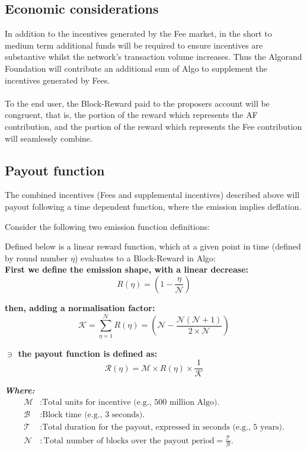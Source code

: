 \documentclass[11pt,a4paper]{article}
\begin{document}
\subsection{Economic considerations} \label{subsec:eco}
In addition to the incentives generated by the Fee market, in the short to medium term additional funds will be required
to ensure incentives are substantive whilst the network's transaction volume increases. Thus the Algorand Foundation 
will contribute an additional sum of Algo to supplement the incentives generated by Fees. \\ \\
To the end user, the \gls{Block-Reward} paid to the proposers account will be congruent, that is, the portion of the
reward which represents the AF contribution, and the portion of the reward which represents the Fee contribution will
seamlessly combine.

\pagebreak

\subsection{Payout function}
The combined incentives (Fees and supplemental incentives) described above will payout following a time dependent 
function, where the emission implies deflation.

Consider the following two emission function definitions:

Defined below is a linear reward function, which at a given point in time (defined by round number $\eta$) evaluates to 
a \gls{Block-Reward} in Algo:\\

\textbf{First we define the emission shape, with a linear decrease:}
\[
R(\eta) = (1- \frac{\eta}{\mathcal{N}})
\]

\textbf{then, adding a normalisation factor:}
\[
\mathcal{K} = \sum_{\eta=1}^\mathcal{N}R(\eta)=(\mathcal{N} -  \frac{\mathcal{N}(\mathcal{N}+1)}{2\times \mathcal{N}})  
\]

\textbf{$\ni$ the payout function is defined as:}
\[
\mathcal{R}(\eta) = \mathcal{M} \times R(\eta) \times \frac{1}{\mathcal{K}}
\]

\textbf{\emph{Where:}}
\begin{align*}
    \mathcal{M} & : \text{Total units for incentive (e.g., 500 million Algo).} \\
    \mathcal{B} & : \text{Block time (e.g., 3 seconds).} \\
    \mathcal{T} & : \text{Total duration for the payout, expressed in seconds (e.g., 5 years).} \\
    \mathcal{N} & : \text{Total number of blocks over the payout period} = \frac{\mathcal{T}}{\mathcal{B}}.\\
\end{align*}
\end{document}
